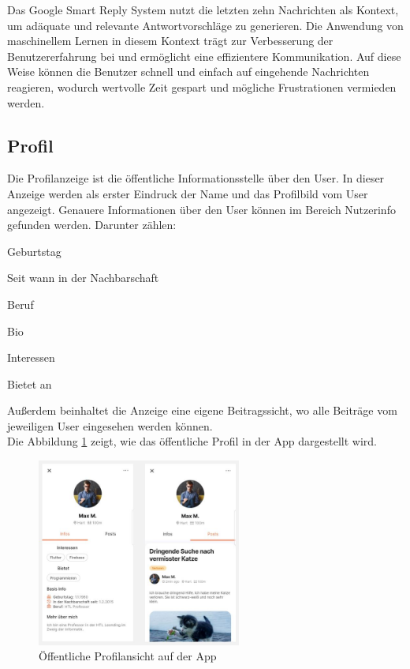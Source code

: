 Das Google Smart Reply System nutzt die letzten zehn Nachrichten als Kontext, um adäquate und relevante Antwortvorschläge zu generieren. Die Anwendung von maschinellem Lernen in diesem Kontext trägt zur Verbesserung der Benutzererfahrung bei und ermöglicht eine effizientere Kommunikation. Auf diese Weise können die Benutzer schnell und einfach auf eingehende Nachrichten reagieren, wodurch wertvolle Zeit gespart und mögliche Frustrationen vermieden werden.


\subsection{Profil}
Die Profilanzeige ist die öffentliche Informationsstelle über den User. In dieser Anzeige werden als erster Eindruck der Name und das Profilbild vom User angezeigt. Genauere Informationen über den User können im Bereich Nutzerinfo gefunden werden. Darunter zählen:
\begin{compactitem}
  \item Geburtstag
  \item Seit wann in der Nachbarschaft
  \item Beruf
  \item Bio
  \item Interessen
  \item Bietet an
\end{compactitem}
Außerdem beinhaltet die Anzeige eine eigene Beitragssicht, wo alle Beiträge vom jeweiligen User eingesehen werden können.
\\
Die Abbildung \ref{fig:public-profile} zeigt, wie das öffentliche Profil in der App dargestellt wird.

\begin{figure}[H]
  \centering
  \includegraphics[width=0.6\textwidth]{pics/public-profile.JPG}
  \caption{Öffentliche Profilansicht auf der App}
  \label{fig:public-profile}
\end{figure}


